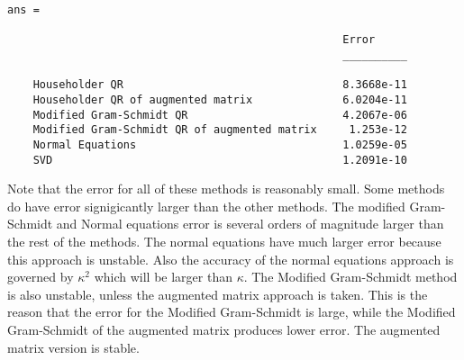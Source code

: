 \documentclass[11pt]{article}
\begin{document}
\begin{enumerate}
\begin{enumerate}
                
                \begin{verbatim}
ans = 

                                                    Error   
                                                    __________

    Householder QR                                  8.3668e-11
    Householder QR of augmented matrix              6.0204e-11
    Modified Gram-Schmidt QR                        4.2067e-06
    Modified Gram-Schmidt QR of augmented matrix     1.253e-12
    Normal Equations                                1.0259e-05
    SVD                                             1.2091e-10
                \end{verbatim}

                Note that the error for all of these methods is reasonably small.
                Some methods do have error signigicantly larger than the other
                methods.
                The modified Gram-Schmidt and Normal equations error is several
                orders of magnitude larger than the rest of the methods.
                The normal equations have much larger error because this approach is
                unstable.
                Also the accuracy of the normal equations approach is governed
                by $\kappa^2$ which will be larger than $\kappa$.
                The Modified Gram-Schmidt method is also unstable, unless the
                augmented matrix approach is taken.
                This is the reason that the error for the Modified Gram-Schmidt
                is large, while the Modified Gram-Schmidt of the augmented matrix
                produces lower error.
                The augmented matrix version is stable.
        \end{enumerate}

\end{enumerate}
\end{document}
